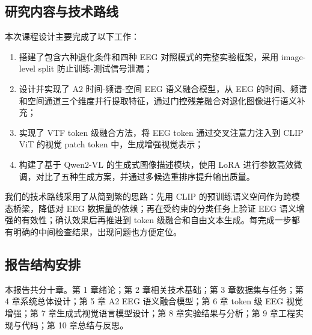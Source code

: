 \subsection{研究内容与技术路线}

本次课程设计主要完成了以下工作：

\begin{enumerate}
  \item 搭建了包含六种退化条件和四种 EEG 对照模式的完整实验框架，采用 image-level split 防止训练-测试信号泄漏；
  \item 设计并实现了 A2 时间-频谱-空间 EEG 语义融合模型，从 EEG 的时间、频谱和空间通道三个维度并行提取特征，通过门控残差融合对退化图像进行语义补充；
  \item 实现了 VTF token 级融合方法，将 EEG token 通过交叉注意力注入到 CLIP ViT 的视觉 patch token 中，生成增强视觉表示；
  \item 构建了基于 Qwen2-VL 的生成式图像描述模块，使用 LoRA 进行参数高效微调，对比了五种生成方案，并通过多候选重排序提升输出质量。
\end{enumerate}

我们的技术路线采用了从简到繁的思路：先用 CLIP 的预训练语义空间作为跨模态桥梁，降低对 EEG 数据量的依赖；再在受约束的分类任务上验证 EEG 语义增强的有效性；确认效果后再推进到 token 级融合和自由文本生成。每完成一步都有明确的中间检查结果，出现问题也方便定位。

\subsection{报告结构安排}

本报告共分十章。第 1 章绪论；第 2 章相关技术基础；第 3 章数据集与任务；第 4 章系统总体设计；第 5 章 A2 EEG 语义融合模型；第 6 章 token 级 EEG 视觉增强；第 7 章生成式视觉语言模型设计；第 8 章实验结果与分析；第 9 章工程实现与代码；第 10 章总结与反思。
